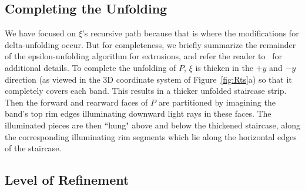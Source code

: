 \documentclass[11pt]{article}
\begin{document}
\subsection{Completing the Unfolding}
\label{sec:frontback}

We have focused on $\xi$'s recursive path because that is where the modifications
for delta-unfolding occur. But for completeness, we briefly summarize the
remainder of the epsilon-unfolding algorithm for extrusions, and
refer the reader to~\cite{Damian-Flatland-O'Rourke-2007-epsilon} for  additional details.
To complete the unfolding of $P$, $\xi$ is thicken in the $+y$ and $-y$ direction (as viewed
in the 3D coordinate system of Figure~\ref{fig:Rts}a) so that it completely covers
each band. This results in a thicker unfolded staircase strip. Then the
forward and rearward faces of $P$ are partitioned by imagining the band's top rim edges illuminating downward light rays in these
faces. The illuminated pieces are then ``hung" above and below the thickened staircase,
along the corresponding illuminating rim segments which lie along the horizontal edges of
the staircase.

\subsection{Level of Refinement}
\end{document}

